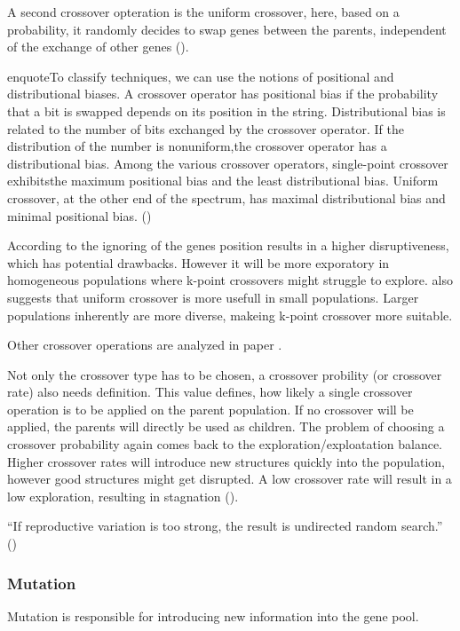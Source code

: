 A second crossover opteration is the uniform crossover, here, based on a probability, it randomly decides to swap genes between the parents, independent of the exchange of other genes (\cite{katoch_review_2021}). 

enquote{To classify techniques, we can use the notions of positional and distributional biases. A crossover operator has positional bias if the probability that a bit is swapped depends on its position in the string. Distributional bias is related to the number of bits exchanged by the crossover operator. If the distribution of the number is nonuniform,the crossover operator has a distributional bias. Among the various crossover operators, single-point crossover exhibitsthe maximum positional bias and the least distributional bias. Uniform crossover, at the other end of the spectrum, has maximal distributional bias and minimal positional bias.} (\cite{srinivas_genetic_1994})

According to \cite{srinivas_genetic_1994} the ignoring of the genes position results in a higher disruptiveness, which has potential drawbacks. However it will be more exporatory in homogeneous populations where k-point crossovers might struggle to explore. \cite{srinivas_genetic_1994} also suggests that uniform crossover is more usefull in small populations. Larger populations inherently are more diverse, makeing k-point crossover more suitable.

Other crossover operations are analyzed in paper . 

Not only the crossover type has to be chosen, a crossover probility (or crossover rate) also needs definition. This value defines, how likely a single crossover operation is to be applied on the parent population. If no crossover will be applied, the parents will directly be used as children.
The problem of choosing a crossover probability again comes back to the exploration/exploatation balance. Higher crossover rates will introduce new structures quickly into the population, however good structures might get disrupted. A low crossover rate will result in a low exploration, resulting in stagnation (\cite{grefenstette_optimization_1986}). 

\enquote{If reproductive variation is too strong, the result is undirected random search.} (\cite{kacprzyk_parameter_2007})

\subsubsection{Mutation}
Mutation is responsible for introducing new information into the gene pool.

